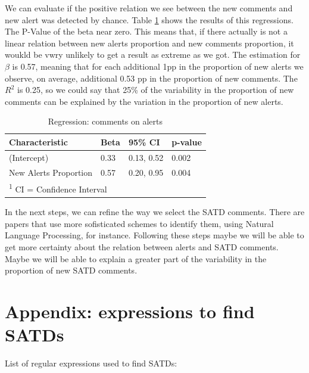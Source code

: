 \documentclass[
]{article}
\begin{document}
We can evaluate if the positive relation we see between the new comments
and new alert was detected by chance. Table \ref{tab_reg} shows the
results of this regressions. The P-Value of the beta near zero. This
means that, if there actually is not a linear relation between new
alerts proportion and new comments proportion, it woukld be vwry
unlikely to get a result as extreme as we got. The estimation for
\(\beta\) is 0.57, meaning that for each additional 1pp in the
proportion of new alerts we observe, on average, additional 0.53 pp in
the proportion of new comments. The \(R^2\) is 0.25, so we could say
that 25\% of the variability in the proportion of new comments can be
explained by the variation in the proportion of new alerts.

\small

\begin{table}

\caption{\label{tab:unnamed-chunk-25}\label{tab_reg} Regression: comments on alerts}
\centering
\begin{tabular}[t]{l|l|l|l}
\hline
Characteristic & Beta & 95\% CI & p-value\\
\hline
(Intercept) & 0.33 & 0.13, 0.52 & 0.002\\
\hline
New Alerts Proportion & 0.57 & 0.20, 0.95 & 0.004\\
\hline
\multicolumn{4}{l}{\textsuperscript{1} CI = Confidence Interval}\\
\end{tabular}
\end{table}

\normalsize

In the next steps, we can refine the way we select the SATD comments.
There are papers that use more sofisticated schemes to identify them,
using Natural Language Processing, for instance. Following these steps
maybe we will be able to get more certainty about the relation between
alerts and SATD comments. Maybe we will be able to explain a greater
part of the variability in the proportion of new SATD comments.

\section{Appendix: expressions to find SATDs}\label{sec_SATDs}

List of regular expressions used to find SATDs:

\small
\end{document}
